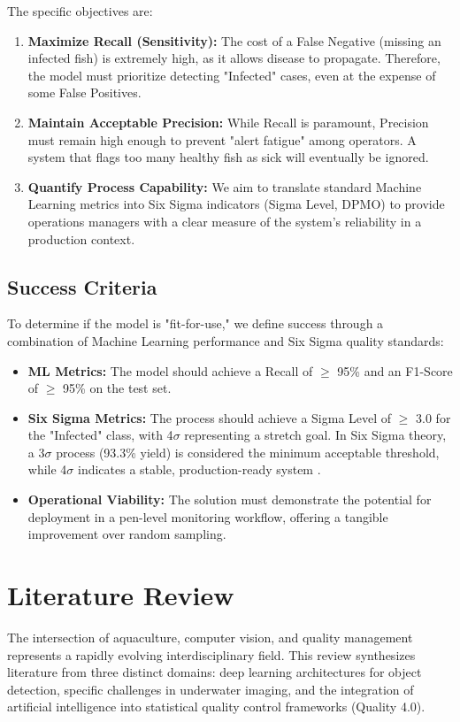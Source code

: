 \documentclass[12pt,a4paper]{article}
\begin{document}
The specific objectives are:
\begin{enumerate}
    \item \textbf{Maximize Recall (Sensitivity):} The cost of a False Negative (missing an infected fish) is extremely high, as it allows disease to propagate. Therefore, the model must prioritize detecting "Infected" cases, even at the expense of some False Positives.
    \item \textbf{Maintain Acceptable Precision:} While Recall is paramount, Precision must remain high enough to prevent "alert fatigue" among operators. A system that flags too many healthy fish as sick will eventually be ignored.
    \item \textbf{Quantify Process Capability:} We aim to translate standard Machine Learning metrics into Six Sigma indicators (Sigma Level, DPMO) to provide operations managers with a clear measure of the system's reliability in a production context.
\end{enumerate}

\subsection{Success Criteria}
To determine if the model is "fit-for-use," we define success through a combination of Machine Learning performance and Six Sigma quality standards:
\begin{itemize}
    \item \textbf{ML Metrics:} The model should achieve a Recall of $\ge$ 95\% and an F1-Score of $\ge$ 95\% on the test set.
    \item \textbf{Six Sigma Metrics:} The process should achieve a Sigma Level of $\ge$ 3.0 for the "Infected" class, with 4$\sigma$ representing a stretch goal. In Six Sigma theory, a 3$\sigma$ process (93.3\% yield) is considered the minimum acceptable threshold, while 4$\sigma$ indicates a stable, production-ready system \citep{Tsung2023}.
    \item \textbf{Operational Viability:} The solution must demonstrate the potential for deployment in a pen-level monitoring workflow, offering a tangible improvement over random sampling.
\end{itemize}

\section{Literature Review}

The intersection of aquaculture, computer vision, and quality management represents a rapidly evolving interdisciplinary field. This review synthesizes literature from three distinct domains: deep learning architectures for object detection, specific challenges in underwater imaging, and the integration of artificial intelligence into statistical quality control frameworks (Quality 4.0).
\end{document}

